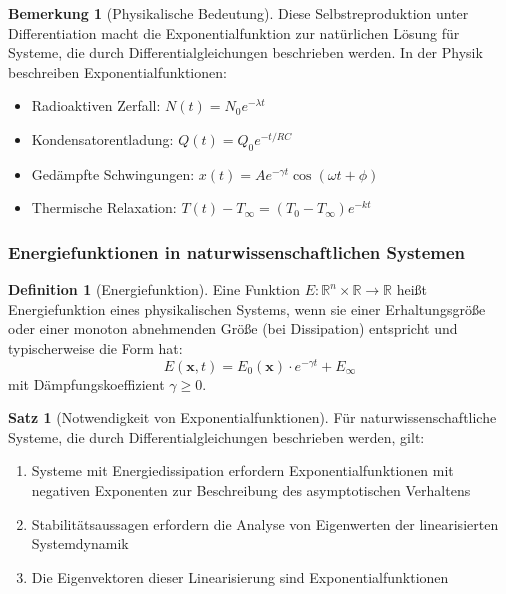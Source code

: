 ﻿\documentclass[a4paper,12pt]{scrreprt}
\theoremstyle{definition}
\newtheorem{definition}{Definition}[section]
\newtheorem{bemerkung}{Bemerkung}[section]
\newtheorem{satz}{Satz}[section]
\begin{document}
\begin{bemerkung}[Physikalische Bedeutung]
	Diese Selbstreproduktion unter Differentiation macht die Exponentialfunktion zur natürlichen Lösung für Systeme, die durch Differentialgleichungen beschrieben werden. In der Physik beschreiben Exponentialfunktionen:
	\begin{itemize}
		\item[-] Radioaktiven Zerfall: $N(t) = N_0 e^{-\lambda t}$
		\item[-] Kondensatorentladung: $Q(t) = Q_0 e^{-t/RC}$
		\item[-] Gedämpfte Schwingungen: $x(t) = A e^{-\gamma t} \cos(\omega t + \phi)$
		\item[-] Thermische Relaxation: $T(t) - T_{\infty} = (T_0 - T_{\infty}) e^{-kt}$
	\end{itemize}
\end{bemerkung}

\subsubsection{Energiefunktionen in naturwissenschaftlichen Systemen}

\begin{definition}[Energiefunktion]
	Eine Funktion $E: \mathbb{R}^n \times \mathbb{R} \to \mathbb{R}$ heißt Energiefunktion eines physikalischen Systems, wenn sie einer Erhaltungsgröße oder einer monoton abnehmenden Größe (bei Dissipation) entspricht und typischerweise die Form hat:
	\begin{equation}
		E(\mathbf{x}, t) = E_0(\mathbf{x}) \cdot e^{-\gamma t} + E_{\infty}
	\end{equation}
	mit Dämpfungskoeffizient $\gamma \geq 0$.
\end{definition}

\begin{satz}[Notwendigkeit von Exponentialfunktionen]
	Für naturwissenschaftliche Systeme, die durch Differentialgleichungen beschrieben werden, gilt:
	\begin{enumerate}
		\item[-] Systeme mit Energiedissipation erfordern Exponentialfunktionen mit negativen Exponenten zur Beschreibung des asymptotischen Verhaltens
		\item[-] Stabilitätsaussagen erfordern die Analyse von Eigenwerten der linearisierten Systemdynamik
		\item[-] Die Eigenvektoren dieser Linearisierung sind Exponentialfunktionen
	\end{enumerate}
\end{satz}
\end{document}
